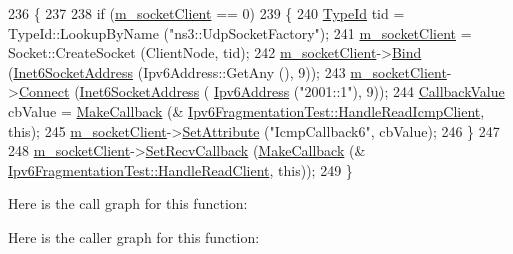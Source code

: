 \begin{DoxyCode}
236 \{
237 
238   \textcolor{keywordflow}{if} (\hyperlink{classIpv6FragmentationTest_a42352629fa60d0a232d6494f6f4210f2}{m\_socketClient} == 0)
239     \{
240       \hyperlink{classns3_1_1TypeId}{TypeId} tid = TypeId::LookupByName (\textcolor{stringliteral}{"ns3::UdpSocketFactory"});
241       \hyperlink{classIpv6FragmentationTest_a42352629fa60d0a232d6494f6f4210f2}{m\_socketClient} = Socket::CreateSocket (ClientNode, tid);
242       \hyperlink{classIpv6FragmentationTest_a42352629fa60d0a232d6494f6f4210f2}{m\_socketClient}->\hyperlink{classns3_1_1Socket_ada93439a43de2028b5a8fc6621dad482}{Bind} (\hyperlink{classns3_1_1Inet6SocketAddress}{Inet6SocketAddress} (Ipv6Address::GetAny (),
       9));
243       \hyperlink{classIpv6FragmentationTest_a42352629fa60d0a232d6494f6f4210f2}{m\_socketClient}->\hyperlink{classns3_1_1Socket_a97f08aaf37b8fd7d4b5cad4dfdd4022a}{Connect} (\hyperlink{classns3_1_1Inet6SocketAddress}{Inet6SocketAddress} (
      \hyperlink{classns3_1_1Ipv6Address}{Ipv6Address} (\textcolor{stringliteral}{"2001::1"}), 9));
244       \hyperlink{classns3_1_1CallbackValue}{CallbackValue} cbValue = \hyperlink{group__makecallbackmemptr_ga9376283685aa99d204048d6a4b7610a4}{MakeCallback} (&
      \hyperlink{classIpv6FragmentationTest_a71cb73de46321641ac92d33df9cfc580}{Ipv6FragmentationTest::HandleReadIcmpClient}, \textcolor{keyword}{this});
245       \hyperlink{classIpv6FragmentationTest_a42352629fa60d0a232d6494f6f4210f2}{m\_socketClient}->\hyperlink{classns3_1_1ObjectBase_ac60245d3ea4123bbc9b1d391f1f6592f}{SetAttribute} (\textcolor{stringliteral}{"IcmpCallback6"}, cbValue);
246     \}
247 
248   \hyperlink{classIpv6FragmentationTest_a42352629fa60d0a232d6494f6f4210f2}{m\_socketClient}->\hyperlink{classns3_1_1Socket_a243f7835ef1a85f9270fd3577e3a40da}{SetRecvCallback} (\hyperlink{group__makecallbackmemptr_ga9376283685aa99d204048d6a4b7610a4}{MakeCallback} (&
      \hyperlink{classIpv6FragmentationTest_ad6c91384e008c34c6b4eb7f60fc7ba31}{Ipv6FragmentationTest::HandleReadClient}, \textcolor{keyword}{this}));
249 \}
\end{DoxyCode}


Here is the call graph for this function\+:




Here is the caller graph for this function\+:


